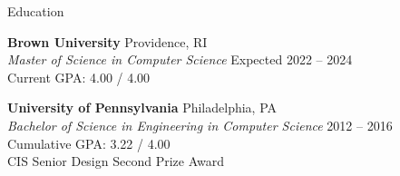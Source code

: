\documentclass{resume} %
\begin{document}

\begin{grouping}{Education}
\item {\bf Brown University} \hfill Providence, RI \\
    {\em Master of Science in Computer Science} \hfill Expected 2022 -- 2024 \\
    Current GPA: 4.00 / 4.00

\item {\bf University of Pennsylvania} \hfill Philadelphia, PA \\
    {\em Bachelor of Science in Engineering in Computer Science} \hfill 2012 -- 2016 \\
    Cumulative GPA: 3.22 / 4.00 \\
    CIS Senior Design Second Prize Award
\end{grouping}

\iffalse
\hspace*{1mm}{\em Relevant Courses:} Advanced Topics in Algorithms and Complexity \\
\hspace*{2mm}Internet \& Web Systems, Computer Operating Systems, Introduction to Artificial Intelligence

\hspace*{1mm} {\bf Belmont High School} \hfill Belmont, MA \\
\hspace*{1mm} Graduate \hfill June 2012 \\
\hspace*{1mm} Cumulative GPA: 3.84 / 4.00
\fi

\end{document}
